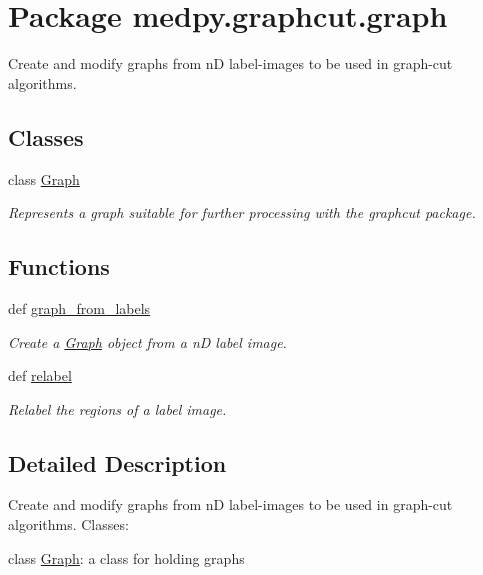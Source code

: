 \hypertarget{namespacemedpy_1_1graphcut_1_1graph}{
\section{Package medpy.graphcut.graph}
\label{namespacemedpy_1_1graphcut_1_1graph}
}


Create and modify graphs from nD label-\/images to be used in graph-\/cut algorithms.  


\subsection*{Classes}
\begin{DoxyCompactItemize}
\item 
class \hyperlink{classmedpy_1_1graphcut_1_1graph_1_1Graph}{Graph}
\begin{DoxyCompactList}\small\item\em Represents a graph suitable for further processing with the graphcut package. \end{DoxyCompactList}\end{DoxyCompactItemize}
\subsection*{Functions}
\begin{DoxyCompactItemize}
\item 
def \hyperlink{namespacemedpy_1_1graphcut_1_1graph_a2fa7c97da5a7cf9c9e5ee62230eca8ba}{graph\_\-from\_\-labels}
\begin{DoxyCompactList}\small\item\em Create a  \hyperlink{classmedpy_1_1graphcut_1_1graph_1_1Graph}{Graph} object from a nD label image. \end{DoxyCompactList}\item 
def \hyperlink{namespacemedpy_1_1graphcut_1_1graph_a60e9e9c436bdb49797ba09b10d97fb2c}{relabel}
\begin{DoxyCompactList}\small\item\em Relabel the regions of a label image. \end{DoxyCompactList}\end{DoxyCompactItemize}


\subsection{Detailed Description}
Create and modify graphs from nD label-\/images to be used in graph-\/cut algorithms. Classes:
\begin{DoxyItemize}
\item class \hyperlink{classmedpy_1_1graphcut_1_1graph_1_1Graph}{Graph}: a class for holding graphs
\end{DoxyItemize}

